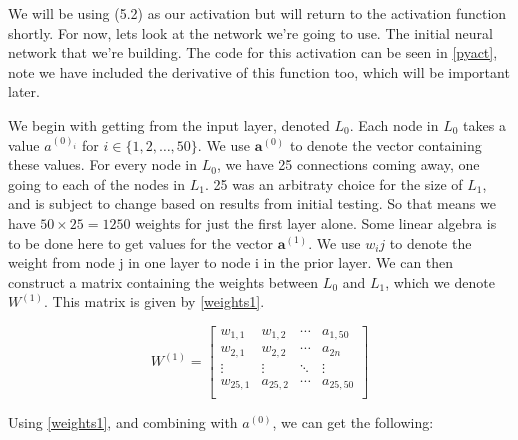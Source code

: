 We will be using (5.2) as our activation but will return to the activation function shortly. For now, lets look at the network we're going to use.
The initial neural network that we're building. The code for this activation can be seen in \ref{pyact}, note we have included the derivative of this function too, which will be important later.


We begin with getting from the input layer, denoted $L_0$. Each node in $L_0$ takes a value $a^{(0)_i}$ for $i \in \{1,2,\ldots,50\}$. We use $\textbf{a}^{(0)}$ to denote the vector
containing these values. For every node in $L_0$, we have 25 connections coming away, one going to each of the nodes in $L_1$. 25 was an arbitraty choice for the size of $L_1$, and is
subject to change based on results from initial testing. So that means we have $50 \times 25 = 1250$ weights for just the first layer alone. Some linear algebra is to be done here to get 
values for the vector $\textbf{a}^{(1)}$. We use $w_ij$ to denote the weight from node j in one layer to node i in the prior layer. We can then construct a matrix containing the weights
between $L_0$ and $L_1$, which we denote $W^{(1)}$. This matrix is given by \ref{weights1}.

\begin{equation}
    W^{(1)} =
    \left[ {\begin{array}{cccc}
      w_{1,1} & w_{1,2} & \cdots & a_{1,50}\\
      w_{2,1} & w_{2,2} & \cdots & a_{2n}\\
      \vdots & \vdots & \ddots & \vdots\\
      w_{25,1} & a_{25,2} & \cdots & a_{25,50}\\
    \end{array} } \right]
    \label{weights1}
\end{equation}

Using \ref{weights1}, and combining with $a^{(0)}$, we can get the following:

